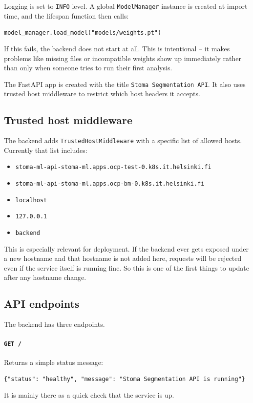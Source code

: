 \documentclass{article}
\begin{document}
Logging is set to \texttt{INFO} level. A global \texttt{ModelManager} instance is created at import time, and the lifespan function then calls:

\begin{center}
\texttt{model\_manager.load\_model("models/weights.pt")}
\end{center}

If this fails, the backend does not start at all. This is intentional -- it makes problems like missing files or incompatible weights show up immediately rather than only when someone tries to run their first analysis.

The FastAPI app is created with the title \texttt{Stoma Segmentation API}. It also uses trusted host middleware to restrict which host headers it accepts.

\subsection{Trusted host middleware}

The backend adds \texttt{TrustedHostMiddleware} with a specific list of allowed hosts. Currently that list includes:

\begin{itemize}
    \item \texttt{stoma-ml-api-stoma-ml.apps.ocp-test-0.k8s.it.helsinki.fi}
    \item \texttt{stoma-ml-api-stoma-ml.apps.ocp-bm-0.k8s.it.helsinki.fi}
    \item \texttt{localhost}
    \item \texttt{127.0.0.1}
    \item \texttt{backend}
\end{itemize}

This is especially relevant for deployment. If the backend ever gets exposed under a new hostname and that hostname is not added here, requests will be rejected even if the service itself is running fine. So this is one of the first things to update after any hostname change.

\subsection{API endpoints}

The backend has three endpoints.

\paragraph{\texttt{GET /}}
Returns a simple status message:
\begin{center}
\texttt{\{"status": "healthy", "message": "Stoma Segmentation API is running"\}}
\end{center}
It is mainly there as a quick check that the service is up.
\end{document}
